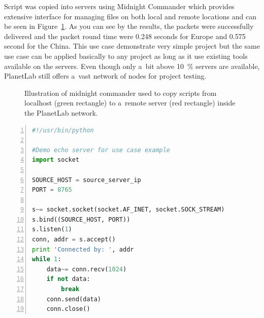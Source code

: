 {{{{{{{Script was copied into servers using Midnight Commander which provides extensive interface for managing files on both local and remote locations and can be seen in Figure~\ref{fig:midnightcommander}. As you can see by the results, the packets were successfully delivered and the packet round time were 0.248 seconds for Europe and 0.575 second for the China. This use case demonstrate very simple project but the same use case can be applied basically to any project as long as it use existing tools available on the servers. Even though only a~bit above \SI{10}{\percent} servers are available, PlanetLab still offers a~vast network of nodes for project testing.

\begin{figure}[H]
	\centering
	\caption{Illustration of midnight commander used to copy scripts from localhost (green rectangle) to a~remote server (red rectangle) inside the PlanetLab network.}
	\label{fig:midnightcommander}
\end{figure}

{\noindent\begin{minipage}{\linewidth}
		\begin{lstlisting}[language=Python, numbers=left, label={lst:echoserver}, caption=Code of echo server., frame=single, showstringspaces=false, keywordstyle=\color{blue},captionpos=b]
#!/usr/bin/python

#Demo echo server for use case example
import socket

SOURCE_HOST = source_server_ip
PORT = 8765

s~= socket.socket(socket.AF_INET, socket.SOCK_STREAM)
s.bind((SOURCE_HOST, PORT))
s.listen(1)
conn, addr = s.accept()
print 'Connected by: ', addr
while 1:
	data~= conn.recv(1024)
	if not data:
		break
	conn.send(data)
	conn.close()
		\end{lstlisting}
	\end{minipage}

}}}}}}}}

